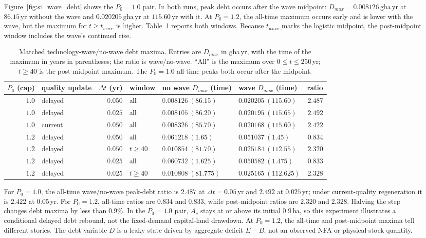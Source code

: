 \documentclass[11pt,a4paper]{article}
\begin{document}
Figure~\ref{fig:si_wave_debt} shows the $P_0=1.0$ pair. In both runs, peak debt occurs after the wave midpoint: $D_{max}=0.008126$\,gha\,yr at $86.15$\,yr without the wave and $0.020205$\,gha\,yr at $115.60$\,yr with it. At $P_0=1.2$, the all-time maximum occurs early and is lower with the wave, but the maximum for $t\ge t_{wave}$ is higher. Table~\ref{tab:si_wave_debt} reports both windows. Because $t_{wave}$ marks the logistic midpoint, the post-midpoint window includes the wave's continued rise.

\begin{table}[htbp]
\centering\small
\caption{Matched technology-wave/no-wave debt maxima. Entries are $D_{max}$ in gha\,yr, with the time of the maximum in years in parentheses; the ratio is wave/no-wave. ``All'' is the maximum over $0\le t\le250$\,yr; $t\ge40$ is the post-midpoint maximum. The $P_0=1.0$ all-time peaks both occur after the midpoint.}
\label{tab:si_wave_debt}
\begin{tabularx}{\textwidth}{r l r l >{\centering\arraybackslash}X >{\centering\arraybackslash}X r}
\toprule
$P_0$ (cap) & quality update & $\Delta t$ (yr) & window & no wave $D_{max}$ (time) & wave $D_{max}$ (time) & ratio \\
\midrule
$1.0$ & delayed & $0.050$ & all & $0.008126\ (86.15)$ & $0.020205\ (115.60)$ & $2.487$ \\
$1.0$ & delayed & $0.025$ & all & $0.008105\ (86.20)$ & $0.020195\ (115.65)$ & $2.492$ \\
$1.0$ & current & $0.050$ & all & $0.008326\ (85.70)$ & $0.020168\ (115.60)$ & $2.422$ \\
$1.2$ & delayed & $0.050$ & all & $0.061218\ (1.65)$ & $0.051037\ (1.45)$ & $0.834$ \\
$1.2$ & delayed & $0.050$ & $t\ge40$ & $0.010854\ (81.70)$ & $0.025184\ (112.55)$ & $2.320$ \\
$1.2$ & delayed & $0.025$ & all & $0.060732\ (1.625)$ & $0.050582\ (1.475)$ & $0.833$ \\
$1.2$ & delayed & $0.025$ & $t\ge40$ & $0.010808\ (81.775)$ & $0.025165\ (112.625)$ & $2.328$ \\
\bottomrule
\end{tabularx}
\end{table}

For $P_0=1.0$, the all-time wave/no-wave peak-debt ratio is $2.487$ at $\Delta t=0.05$\,yr and $2.492$ at $0.025$\,yr; under current-quality regeneration it is $2.422$ at $0.05$\,yr. For $P_0=1.2$, all-time ratios are $0.834$ and $0.833$, while post-midpoint ratios are $2.320$ and $2.328$. Halving the step changes debt maxima by less than $0.9\%$. In the $P_0=1.0$ pair, $A_c$ stays at or above its initial $0.9$\,ha, so this experiment illustrates a conditional delayed debt rebound, not the fixed-demand capital-land drawdown. At $P_0=1.2$, the all-time and post-midpoint maxima tell different stories. The debt variable $D$ is a leaky state driven by aggregate deficit $E-B$, not an observed NFA or physical-stock quantity.
\end{document}
